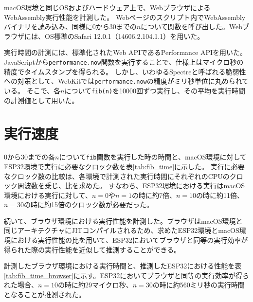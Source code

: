 macOS環境と同じOSおよびハードウェア上で、WebブラウザによるWebAssembly実行性能を計測した。
Webページのスクリプト内でWebAssemblyバイナリを読み込み、同様に0から30までの$n$について関数を呼び出した。Webブラウザには、OS標準のSafari 12.0.1（14606.2.104.1.1）を用いた。

実行時間の計測には、標準化されたWeb APIであるPerformance APIを用いた。
JavaScriptから\verb|performance.now|関数を実行することで、仕様上はマイクロ秒の精度でタイムスタンプを得られる。
しかし、いわゆるSpectreと呼ばれる脆弱性への対策として、WebKitでは\verb|performance.now|の精度がミリ秒単位に丸められている\cite{webkit_spectre}\cite{webkit_trac}。
そこで、各$n$について\verb|fib(n)|を10000回ずつ実行し、その平均を実行時間の計測値として用いた。

\section{実行速度}

0から30までの各$n$について\verb|fib|関数を実行した時の時間と、macOS環境に対してESP32環境で実行に必要なクロック数を表\ref{tab:fib_time}に示した。
実行に必要なクロック数の比較は、各環境で計測された実行時間にそれぞれのCPUのクロック周波数を乗じ、比を求めた。
すなわち、ESP32環境における実行はmacOS環境における実行に対して、$n=0$や$n=1$の時に約7倍、$n=10$の時に約11倍、$n=30$の時に約15倍のクロック数が必要だった。

続いて、ブラウザ環境における実行性能を計測した。ブラウザはmacOS環境と同じアーキテクチャにJITコンパイルされるため、求めたESP32環境とmacOS環境における実行性能の比を用いて、ESP32においてブラウザと同等の実行効率が得られた際の実行性能を近似して推測することができる。

計測したブラウザ環境における実行時間と、推測したESP32における性能を表\ref{tab:fib_time_browser}に示す。ESP32においてブラウザと同等の実行効率が得られた場合、$n=10$の時に約29マイクロ秒、$n=30$の時に約560ミリ秒の実行時間となることが推測された。


